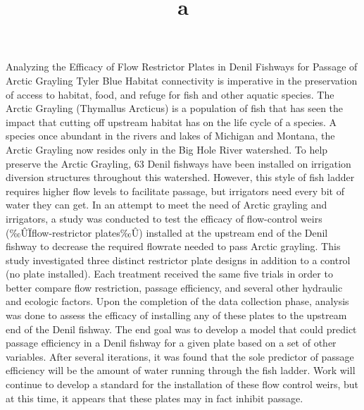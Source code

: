 \documentclass[]{article}
\title{a}
\author{}
\date{}
\begin{document}
\maketitle

Analyzing the Efficacy of Flow Restrictor Plates in Denil Fishways for
Passage of Arctic Grayling Tyler Blue Habitat connectivity is imperative
in the preservation of access to habitat, food, and refuge for fish and
other aquatic species. The Arctic Grayling (Thymallus Arcticus) is a
population of fish that has seen the impact that cutting off upstream
habitat has on the life cycle of a species. A species once abundant in
the rivers and lakes of Michigan and Montana, the Arctic Grayling now
resides only in the Big Hole River watershed. To help preserve the
Arctic Grayling, 63 Denil fishways have been installed on irrigation
diversion structures throughout this watershed. However, this style of
fish ladder requires higher flow levels to facilitate passage, but
irrigators need every bit of water they can get. In an attempt to meet
the need of Arctic grayling and irrigators, a study was conducted to
test the efficacy of flow-control weirs (‰ÛÏflow-restrictor plates‰Û)
installed at the upstream end of the Denil fishway to decrease the
required flowrate needed to pass Arctic grayling. This study
investigated three distinct restrictor plate designs in addition to a
control (no plate installed). Each treatment received the same five
trials in order to better compare flow restriction, passage efficiency,
and several other hydraulic and ecologic factors. Upon the completion of
the data collection phase, analysis was done to assess the efficacy of
installing any of these plates to the upstream end of the Denil fishway.
The end goal was to develop a model that could predict passage
efficiency in a Denil fishway for a given plate based on a set of other
variables. After several iterations, it was found that the sole
predictor of passage efficiency will be the amount of water running
through the fish ladder. Work will continue to develop a standard for
the installation of these flow control weirs, but at this time, it
appears that these plates may in fact inhibit passage.
\end{document}

